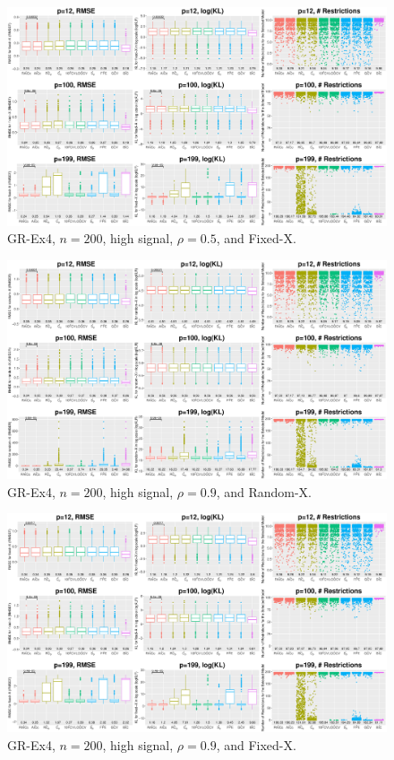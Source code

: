 \begin{figure}[!ht]
\centering
\includegraphics[width=\textwidth]{figures/supplement/fixedx_GR-Ex4_n200_hsnr_rho05.eps}
\caption{GR-Ex4, $n=200$, high signal, $\rho=0.5$, and Fixed-X.}
\end{figure}
\clearpage
\begin{figure}[!ht]
\centering
\includegraphics[width=\textwidth]{figures/supplement/randomx_GR-Ex4_n200_hsnr_rho09.eps}
\caption{GR-Ex4, $n=200$, high signal, $\rho=0.9$, and Random-X.}
\end{figure}
\begin{figure}[!ht]
\centering
\includegraphics[width=\textwidth]{figures/supplement/fixedx_GR-Ex4_n200_hsnr_rho09.eps}
\caption{GR-Ex4, $n=200$, high signal, $\rho=0.9$, and Fixed-X.}
\end{figure}

